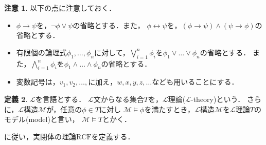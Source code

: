 \documentclass[uplatex, dvipdfmx]{jsarticle}
\numberwithin{equation}{section}
\newcommand{\RCF}{\mathrm{RCF}}
\theoremstyle{definition}
\newtheorem{definition}{定義}[section]
\newtheorem{remark}[definition]{注意}
\begin{document}
\begin{remark}
     以下の点に注意しておく．

     \begin{itemize}
          \item
               $\phi \rightarrow \psi$を，$\lnot \phi \lor \psi$の省略とする．また，
               $\phi \leftrightarrow \psi$を，$(\phi \rightarrow \psi)\land(\psi \rightarrow \phi)$の省略とする．
          \item
               有限個の論理式$\phi_1, \dots, \phi_n$に対して，$\bigvee_{i=1}^n \phi_i$を$\phi_1 \lor \dots \lor \phi_n$の省略とする．
               また，$\bigwedge_{i=1}^n \phi_i$を$\phi_1 \land \dots \land \phi_n$の省略とする．
          \item     
               変数記号は，$v_1, v_2, \dots, $に加え，$w, x, y, z, \dots$なども用いることにする．
          \end{itemize}
\end{remark}

\begin{definition}
     $\mathcal{L}$を言語とする．
     $\mathcal{L}$文からなる集合$T$を，$\mathcal{L}$理論($\mathcal{L}$-theory)という．
     さらに，$\mathcal{L}$構造$\mathcal{M}$が，任意の$\phi \in T$に対し
     $\mathcal{M} \models \phi$を満たすとき，$\mathcal{L}$構造$\mathcal{M}$を$\mathcal{L}$理論$T$のモデル(model)と言い，
     $\mathcal{M} \models T$とかく．
\end{definition}



\cite{Arai}に従い，実閉体の理論$\RCF$を定義する．
\end{document}
